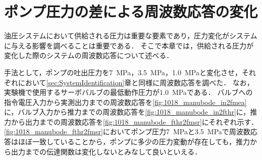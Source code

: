 \chapter{ポンプ圧力の差による周波数応答の変化}
油圧システムにおいて供給される圧力は重要な要素であり，圧力変化がシステムに与える影響を調べることは重要である．
そこで本章では，供給される圧力が変化した際のシステムの周波数応答について述べる．

手法として，ポンプの吐出圧力を\SI{7}{MPa}，\SI{3.5}{MPa}，\SI{1.0}{MPa}と変化させ，それぞれにおいて\ref{sec:SystemIdentification}章と同様に周波数応答を調べた．
なお，実験機で使用するサーボバルブの最低動作圧力が\SI{1.0}{MPa}である．
バルブへの指令電圧入力から実測出力までの周波数応答を\figname\ref{fig:1018_manubode_in2fmea}に，バルブ入力から推力までの周波数応答を\figname\ref{fig:1018_manubode_in2fthr}に，推力から出力までの周波数応答を\figname\ref{fig:1018_manubode_fthr2fmsr}にそれぞれ示す．
\figname\ref{fig:1018_manubode_fthr2fmsr}においてポンプ圧力\SI{7}{MPa}と\SI{3.5}{MPa}で周波数応答はほぼ一致していることから，ポンプに多少の圧力変動が存在しても，推力から出力までの伝達関数は変化しないとみなして良いといえる．


